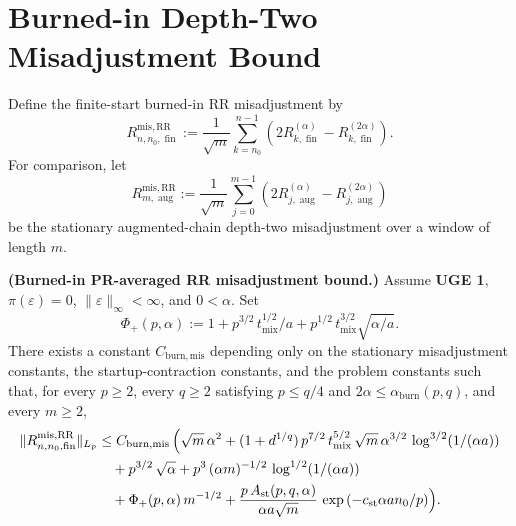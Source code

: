 
\section{Burned-in Depth-Two Misadjustment Bound}

Define the finite-start burned-in RR misadjustment by
\begin{equation}
R_{n,n_{0}, \operatorname{fin}}^{\mathrm{mis,RR}}
  := \frac{1}{\sqrt{m}} \sum_{k = n_{0}}^{n - 1}
    \left( 2 R_{k, \operatorname{fin}}^{(\alpha)}
        - R_{k, \operatorname{fin}}^{(2 \alpha)} \right).
\label{eq:burn-mis-fin-def}
\end{equation}
For comparison, let
\begin{equation}
R_{m, \operatorname{aug}}^{\mathrm{mis,RR}}
  := \frac{1}{\sqrt{m}} \sum_{j = 0}^{m - 1}
    \left( 2 R_{j, \operatorname{aug}}^{(\alpha)}
        - R_{j, \operatorname{aug}}^{(2 \alpha)} \right)
\label{eq:burn-mis-aug-def}
\end{equation}
be the stationary augmented-chain depth-two misadjustment over a window of
length $m$.

\begin{theorem}\label{thm:burn-misadjustment}
  \textbf{(Burned-in PR-averaged RR misadjustment bound.)}
  Assume \textbf{UGE 1}, $\pi(\varepsilon) = 0$, $\lVert \varepsilon \rVert_{\infty} < \infty$,
  and $0 < \alpha$. Set
  \[
\Phi_{+}(p, \alpha) := 1 + p^{3 / 2} \, t_{\mathrm{mix}}^{1 / 2} / a
                   + p^{1 / 2} \, t_{\mathrm{mix}}^{3 / 2} \sqrt{\alpha / a}.
\]
  There exists a constant $C_{\mathrm{burn,mis}}$ depending only on the stationary
  misadjustment constants, the startup-contraction constants, and the problem
  constants such that, for every $p \ge 2$, every $q \ge 2$ satisfying
  $p \le q / 4$ and $2 \alpha \le \alpha_{\mathrm{burn}}(p,q)$, and every $m \ge 2$,
  \begin{equation}
\begin{aligned}
\lVert R_{n,n_{0}, \operatorname{fin}}^{\mathrm{mis,RR}} \rVert_{L_{p}}
    &\le C_{\mathrm{burn,mis}} \, \Bigl( \sqrt{m} \, \alpha^{2}
      + (1 + d^{1 / q}) \, p^{7 / 2} \, t_{\mathrm{mix}}^{5 / 2}
        \, \sqrt{m} \, \alpha^{3 / 2}
        \, \log^{3 / 2}(1 / (\alpha a)) \\
    &\quad + p^{3 / 2} \, \sqrt{\alpha}
      + p^{3} \, (\alpha m)^{-1 / 2}
        \, \log^{1 / 2}(1 / (\alpha a)) \\
    &\quad + \Phi_{+}(p, \alpha) \, m^{-1 / 2}
      + \frac{p \, A_{\mathrm{st}}(p,q,\alpha)}{\alpha a \sqrt{m}}
        \, \exp\left(-c_{\mathrm{st}} \alpha a n_{0} / p\right) \Bigr).
\end{aligned}
\label{eq:burn-mis-bound}
\end{equation}
\end{theorem}

